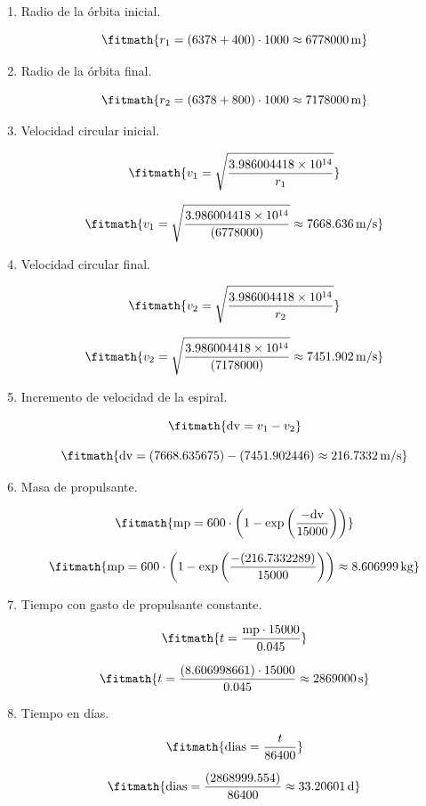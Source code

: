 \begin{enumerate}

\item Radio de la órbita inicial.

\[\fitmath{r_{1}=\left(6378+400\right)\cdot 1000\approx 6778000\,\mathrm{m}}\]

\item Radio de la órbita final.

\[\fitmath{r_{2}=\left(6378+800\right)\cdot 1000\approx 7178000\,\mathrm{m}}\]

\item Velocidad circular inicial.

\[\fitmath{v_{1}=\sqrt{\frac{3.986004418\times10^{14}}{r_{1}}}}\]

\[\fitmath{v_{1}=\sqrt{\frac{3.986004418\times10^{14}}{(6778000)}}\approx 7668.636\,\mathrm{m/s}}\]

\item Velocidad circular final.

\[\fitmath{v_{2}=\sqrt{\frac{3.986004418\times10^{14}}{r_{2}}}}\]

\[\fitmath{v_{2}=\sqrt{\frac{3.986004418\times10^{14}}{(7178000)}}\approx 7451.902\,\mathrm{m/s}}\]

\item Incremento de velocidad de la espiral.

\[\fitmath{\mathrm{dv}=v_{1}-v_{2}}\]

\[\fitmath{\mathrm{dv}=(7668.635675)-(7451.902446)\approx 216.7332\,\mathrm{m/s}}\]

\item Masa de propulsante.

\[\fitmath{\mathrm{mp}=600\cdot \left(1-\exp\left(\frac{-\mathrm{dv}}{15000}\right)\right)}\]

\[\fitmath{\mathrm{mp}=600\cdot \left(1-\exp\left(\frac{-(216.7332289)}{15000}\right)\right)\approx 8.606999\,\mathrm{kg}}\]

\item Tiempo con gasto de propulsante constante.

\[\fitmath{t=\frac{\mathrm{mp}\cdot 15000}{0.045}}\]

\[\fitmath{t=\frac{(8.606998661)\cdot 15000}{0.045}\approx 2869000\,\mathrm{s}}\]

\item Tiempo en días.

\[\fitmath{\mathrm{dias}=\frac{t}{86400}}\]

\[\fitmath{\mathrm{dias}=\frac{(2868999.554)}{86400}\approx 33.20601\,\mathrm{d}}\]

\end{enumerate}

